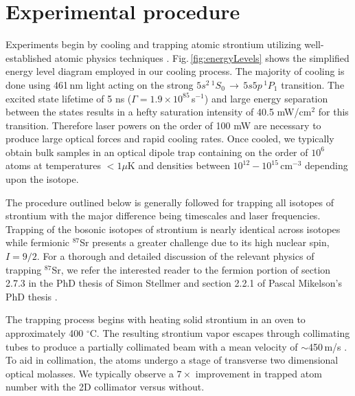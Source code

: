 \section{Experimental procedure} \label{sec:trapping}
\setcounter{footnote}{0}
Experiments begin by cooling and trapping atomic strontium utilizing well-established atomic physics techniques \cite{Metcalf1999,Katori1999,Ido2000,Nagel2003,Mukaiyama2003a,Loftus2004,mmy09a,sth09a,Mickelson2010ja,Tey2010a,dym10a,stg10}. 
Fig.\,\ref{fig:energyLevels} shows the simplified energy level diagram employed in our cooling process.
The majority of cooling is done using 461\,nm light acting on the strong $5s^2\,^1S_0\,\rightarrow\,5s5p\,^1P_1$ transition.
The excited state lifetime of 5 ns ($\Gamma=1.9 \times 10^85$\,s$^{-1}$) and large energy separation between the states results in a hefty saturation intensity of 40.5 mW/cm$^2$ for this transition.
Therefore laser powers on the order of 100 mW are necessary to produce large optical forces and rapid cooling rates.
Once cooled, we typically obtain bulk samples in an optical dipole trap containing on the order of $10^6$ atoms at temperatures $<1\mu$K and densities between $10^{12} - 10^{15}\,$cm$^{-3}$ depending upon the isotope. 

The procedure outlined below is generally followed for trapping all isotopes of strontium with the major difference being timescales and laser frequencies.
Trapping of the bosonic isotopes of strontium is nearly identical across isotopes while fermionic $^{87}$Sr presents a greater challenge due to its high nuclear spin, $I=9/2$.
For a thorough and detailed discussion of the relevant physics of trapping $^{87}$Sr, we refer the interested reader to the fermion portion of section 2.7.3 in the PhD thesis of Simon Stellmer \cite{SimonStellmer2013} and section 2.2.1 of Pascal Mikelson's PhD thesis \cite{Mickelson2010b}.

The trapping process begins with heating solid strontium in an oven to approximately 400 $^{\circ}$C. 
The resulting strontium vapor escapes through collimating tubes to produce a partially collimated beam with a mean velocity of $\sim$450\,m/s \cite{Mazurenko2010}.
To aid in collimation, the atoms undergo a stage of transverse two dimensional optical molasses.
We typically observe a $7\times$ improvement in trapped atom number with the 2D collimator versus without.

